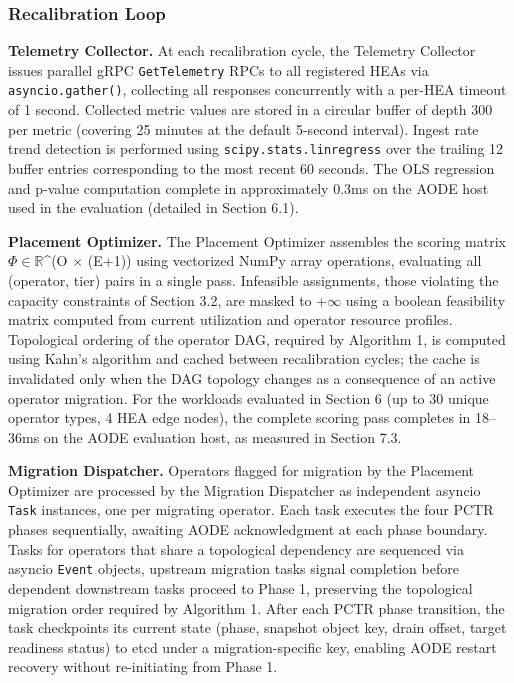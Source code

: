 \documentclass[preprint,review,12pt]{elsarticle}
\begin{document}
\subsubsection{Recalibration Loop}\label{recalibration-loop}

\textbf{Telemetry Collector.} At each recalibration cycle, the Telemetry Collector issues parallel gRPC \texttt{GetTelemetry} RPCs to all registered HEAs via \texttt{asyncio.gather()}, collecting all responses concurrently with a per-HEA timeout of 1 second. Collected metric values are stored in a circular buffer of depth 300 per metric (covering 25 minutes at the default 5-second interval). Ingest rate trend detection is performed using \texttt{scipy.stats.linregress} \cite{scipy2020} over the trailing 12 buffer entries corresponding to the most recent 60 seconds. The OLS regression and p-value computation complete in approximately 0.3ms on the AODE host used in the evaluation (detailed in Section 6.1).

\textbf{Placement Optimizer.} The Placement Optimizer assembles the scoring matrix $\Phi\in\mathbb{R}$\^{}(\textbar O\textbar{} $\times$ (\textbar E\textbar+1)) using vectorized NumPy \cite{numpy2020} array operations, evaluating all (operator, tier) pairs in a single pass. Infeasible assignments, those violating the capacity constraints of Section 3.2, are masked to +$\infty$ using a boolean feasibility matrix computed from current utilization and operator resource profiles. Topological ordering of the operator DAG, required by Algorithm 1, is computed using Kahn's algorithm \cite{kahn1962topological} and cached between recalibration cycles; the cache is invalidated only when the DAG topology changes as a consequence of an active operator migration. For the workloads evaluated in Section 6 (up to 30 unique operator types, 4 HEA edge nodes), the complete scoring pass completes in 18--36ms on the AODE evaluation host, as measured in Section 7.3.

\textbf{Migration Dispatcher.} Operators flagged for migration by the Placement Optimizer are processed by the Migration Dispatcher as independent asyncio \texttt{Task} instances, one per migrating operator. Each task executes the four PCTR phases sequentially, awaiting AODE acknowledgment at each phase boundary. Tasks for operators that share a topological dependency are sequenced via asyncio \texttt{Event} objects, upstream migration tasks signal completion before dependent downstream tasks proceed to Phase 1, preserving the topological migration order required by Algorithm 1. After each PCTR phase transition, the task checkpoints its current state (phase, snapshot object key, drain offset, target readiness status) to etcd under a migration-specific key, enabling AODE restart recovery without re-initiating from Phase 1.
\end{document}
